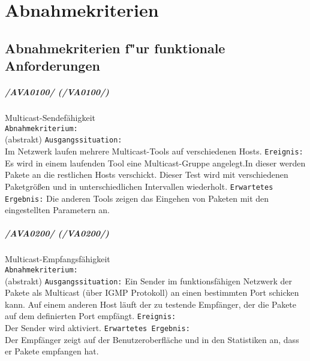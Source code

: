 \chapter{Abnahmekriterien}
\label{cha:abna}

\section{Abnahmekriterien f"ur funktionale Anforderungen}


\paragraph{/AVA0100/ (/VA0100/)} Multicast-Sendefähigkeit\\%
\texttt{Abnahmekriterium:} \\(abstrakt)
\texttt{Ausgangssituation:} \\Im Netzwerk laufen mehrere Multicast-Tools auf
verschiedenen Hosts.
\texttt{Ereignis:} Es wird in einem laufenden Tool eine Multicast-Gruppe
angelegt.In dieser werden Pakete an die restlichen Hosts verschickt. Dieser Test
wird mit  verschiedenen Paketgrößen und in unterschiedlichen Intervallen
wiederholt. 
\texttt{Erwartetes Ergebnis:} Die anderen Tools zeigen das Eingehen von Paketen
mit den eingestellten Parametern an.

\paragraph{/AVA0200/ (/VA0200/)} Multicast-Empfangsfähigkeit\\%
\texttt{Abnahmekriterium:} \\ (abstrakt)
\texttt{Ausgangssituation:} Ein Sender im funktionsfähigen
Netzwerk der Pakete als Multicast (über IGMP Protokoll) an einen bestimmten
Port schicken kann. Auf einem anderen Host läuft der zu testende Empfänger, der
die Pakete auf dem definierten Port empfängt. 
\texttt{Ereignis:} \\Der Sender wird aktiviert. 
\texttt{Erwartetes Ergebnis:}\\Der Empfänger zeigt auf der Benutzeroberfläche und in den Statistiken an, dass er Pakete empfangen hat.

